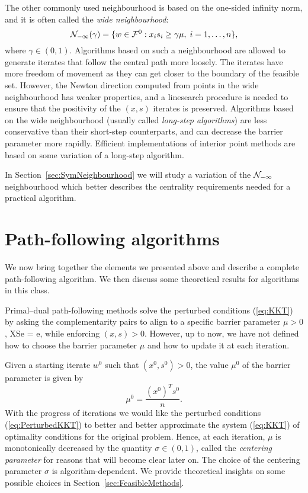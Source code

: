 The other commonly used neighbourhood is based 
on the one-sided infinity norm, 
and it is often called the {\em wide neighbourhood}:
\[
\mathcal{N}_{-\infty}(\gamma) = \{ w \in \mathcal{F}^0 :
                         x_is_i \ge \gamma\mu, \; i = 1, \ldots, n \},
\]
where $\gamma \in (0,1).$
Algorithms based on such a neighbourhood are allowed to generate
iterates that follow the central path more loosely. The iterates 
have more freedom of movement as they can get closer to the boundary
of the feasible set.
However, the Newton direction computed from points in the wide 
neighbourhood  has weaker properties, and a linesearch procedure is
needed to ensure that the positivity of the $(x,s)$ iterates is
preserved.
Algorithms based on the wide neighbourhood (usually called
{\em long-step algorithms}) are less conservative than their short-step
counterparts, and can decrease 
the barrier parameter more rapidly.
Efficient implementations of interior point methods are based
on some variation of a long-step algorithm.

In Section~\ref{sec:SymNeighbourhood} we will study a variation
of the $\mathcal{N}_{-\infty}$ neighbourhood which better describes
the centrality requirements needed for a practical algorithm.



%
%
\section{Path-following algorithms}
\label{sec:PathFollowingAlgorithms}

We now bring together the elements we presented above and describe
a complete path-following algorithm. We then discuss some
theoretical results for algorithms in this class.

Primal--dual path-following methods solve the perturbed \KKT
conditions (\ref{eq:KKT}) by asking the complementarity pairs to align 
to a specific barrier parameter $\mu > 0$,
\be  \label{eq:PerturbedComplementarity}
XSe = \mu e,
\ee
while enforcing $(x,s)>0$.
However, up to now, we have not defined how to choose the
barrier parameter $\mu$ and how to update it at each iteration.

Given a starting iterate $w^0$ such that $(x^0, s^0) > 0$, the value $\mu^0$ 
of the barrier parameter is given by
\[
   \mu^0 = \frac{(x^0)^T s^0}{n}.
\]
With the progress of iterations 
we would like the perturbed \KKT conditions (\ref{eq:PerturbedKKT}) 
to better and better approximate
the system (\ref{eq:KKT}) of optimality conditions for the original
problem.
Hence, at each iteration, $\mu$ is monotonically decreased by the quantity
$\sigma \in (0,1)$, called the {\em centering parameter} for reasons that
will become clear later on.
The choice of the centering parameter $\sigma$ 
is algorithm-dependent. We provide theoretical insights on some
possible choices in Section~\ref{sec:FeasibleMethods}.


